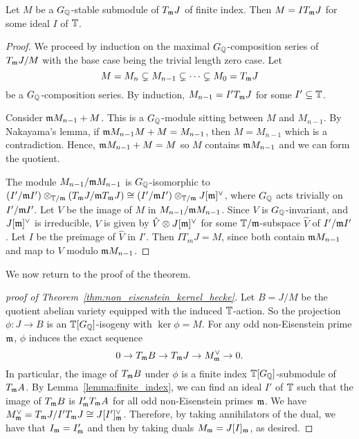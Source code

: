 \documentclass{article}
\begin{document}
\begin{lemma}\label{lemma:finite_index}
    Let $M$ be a $G_{\mathbb{Q}}$-stable submodule of $T_{\mathfrak{m}} J$ of finite index. Then
    $M=IT_{\mathfrak{m}} J$ for some ideal $I$ of $\mathbb{T}$.
\end{lemma}
\begin{proof}
    We proceed by induction on the maximal $G_{\mathbb{Q}}$-composition series of $T_{\mathfrak{m}} J/M$
    with the base case being the trivial length zero case. Let 
    \[
        M = M_n \subsetneq M_{n-1} \subsetneq \cdots \subsetneq M_0 = T_{\mathfrak{m}} J
    \]
    be a $G_{\mathbb{Q}}$-composition series. By induction, $M_{n-1} = I'T_{\mathfrak{m}} J$ for some
    $I'\subseteq \mathbb{T}$.

    Consider $\mathfrak{m} M_{n-1} + M$. This is a $G_{\mathbb{Q}}$-module sitting between $M$ and
    $M_{n-1}$. By Nakayama's lemma, if $\mathfrak{m} M_{n-1} M + M = M_{n-1}$, then
    $M=M_{n-1}$ which is a contradiction. Hence, $\mathfrak{m} M_{n-1}+M=M$ so $M$
    contains $\mathfrak{m} M_{n-1}$ and we can form the quotient.

    The module $M_{n-1}/\mathfrak{m} M_{n-1}$ is $G_{\mathbb{Q}}$-isomorphic to $(I'/\mathfrak{m}
    I')\otimes_{\mathbb{T}/\mathfrak{m}} (T_{\mathfrak{m}} J/\mathfrak{m} T_{\mathfrak{m}} J) \cong (I'/\mathfrak{m} I')\otimes_{\mathbb{T}/\mathfrak{m}}
    J[\mathfrak{m}]^\vee$, where $G_{\mathbb{Q}}$ acts trivially on $I'/\mathfrak{m} I'$. Let $V$ be the image
    of $M$ in $M_{n-1}/\mathfrak{m} M_{n-1}$. Since $V$ is $G_{\mathbb{Q}}$-invariant, and
    $J[\mathfrak{m}]^\vee$ is irreducible, $V$ is given by $\hat{V}\otimes J[\mathfrak{m}]^\vee$
    for some $\mathbb{T}/\mathfrak{m}$-subspace $\hat{V}$ of $I'/\mathfrak{m} I'$. Let $I$ be the preimage
    of $\hat{V}$ in $I'$. Then $IT_m J = M$, since both contain $\mathfrak{m} M_{n-1}$
    and map to $V$ modulo $\mathfrak{m} M_{n-1}$.
\end{proof}

We now return to the proof of the theorem.

\begin{proof}[proof of Theorem~\ref{thm:non_eisenstein_kernel_hecke}]
    Let $B=J/M$ be the quotient abelian variety equipped with the induced
    $\mathbb{T}$-action. So the projection $\phi:J \to B$ is an $\mathbb{T}[G_{\mathbb{Q}}]$-isogeny
    with $\ker\phi = M$. For any odd non-Eisenstein prime $\mathfrak{m}$, $\phi$ induces
    the exact sequence
    \[ 
        0 \to T_{\mathfrak{m}} B \to T_{\mathfrak{m}} J \to M^\vee _{\mathfrak{m}} \to 0.
    \] 
    In particular, the image of $T_{\mathfrak{m}} B$ under $\phi$ is a finite index
    $\mathbb{T}[G_{\mathbb{Q}}]$-submodule of $T_{\mathfrak{m}} A$. By Lemma~\ref{lemma:finite_index}, we can find
    an ideal $I'$ of $\mathbb{T}$ such that the image of $T_{\mathfrak{m}} B$ is $I' _{\mathfrak{m}} T_{\mathfrak{m}} A$
    for all odd non-Eisenstein primes $\mathfrak{m}$. We have $M^\vee _{\mathfrak{m}} = T_{\mathfrak{m}} J / I'
    T_{\mathfrak{m}} J\cong J[I']_{\mathfrak{m}} ^\vee$. Therefore, by taking annihilators of the dual,
    we have that $I_{\mathfrak{m}} = I'_{\mathfrak{m}}$ and then by taking duals $M_{\mathfrak{m}} = J[I]_{\mathfrak{m}}$, as
    desired.
\end{proof}
\end{document}
